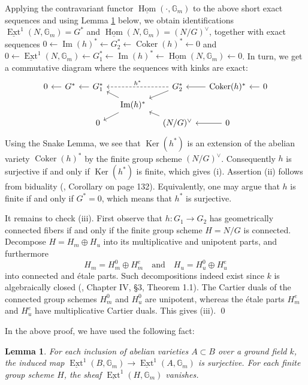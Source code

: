 \documentclass[oneside, 12pt]{amsart}
\newcommand\mylabel[1]{\label{#1}\marginpar{\vspace{-1ex}\medskip\medskip\footnotesize \tt #1}}
\renewcommand\mylabel[1]{\label{#1}}
\newtheorem{lemma}[theorem]{Lemma}
\theoremstyle{definition}
\theoremstyle{remark}
\newcommand{\GG}{\mathbb{G}}
\newcommand{\Cokernel}{\operatorname{Coker}}
\newcommand{\Image}{\operatorname{Im}}
\newcommand{\Kernel}{\operatorname{Ker}}
\newcommand{\quadand}{\quad\text{and}\quad}
\newcommand{\ra}{\rightarrow}
\newcommand{\uHom}{\underline{\operatorname{Hom}}}
\newcommand{\uExt}{\underline{\operatorname{Ext}}}
\begin{document}
Applying the contravariant functor $\uHom(\cdot,\GG_m)$ to the above short exact sequences and using Lemma \ref{sheaf ext} below, we obtain   identifications
$\uExt^1(N,\GG_m)=G^*$ and $\uHom(N,\GG_m)=(N/G)^\vee$, 
together with    exact sequences $0\leftarrow \Image(h)^*\leftarrow G_2^*\leftarrow \Cokernel(h)^*\leftarrow 0$ and 
$0\leftarrow \uExt^1(N,\GG_m)\leftarrow G_1^*\leftarrow \Image(h)^*\leftarrow\uHom(N,\GG_m)\leftarrow 0$.
In turn, we get a commutative  diagram  where the sequences with kinks are exact:
$$
\begin{tikzcd}[row sep=tiny, column sep=small ]
0	& G^*\ar[l]	& G_1^*\ar[l]		&		& G_2^*\ar[ld]\ar[ll,dashed,"h^*"']	& \Cokernel(h)^*\ar[l]	& 0\ar[l]\\
	&	&	& \Image(h)^*\ar[ld]\ar[lu]\\
	&	& 0	&		& (N/G)^\vee\ar[lu]	& 0\ar[l]
\end{tikzcd}
$$
Using the Snake Lemma, we see that $\Kernel(h^*)$ is an extension of the abelian variety $\Cokernel(h)^*$ by the finite group scheme
$(N/G)^\vee$. Consequently $h$ is surjective if and only if $\Kernel(h^*)$ is finite, which gives (i).
Assertion (ii) follows from biduality (\cite{Mumford 1970}, Corollary on page 132). Equivalently, one may argue that $h$ is finite if and only if $G^*=0$,
which means that $h^*$ is surjective.

It remains to check (iii). First observe that  $h:G_1\ra G_2$ has  geometrically connected fibers if and only if the finite group scheme $H=N/G$ is connected.
Decompose $H=H_m\oplus H_u$ into its multiplicative and unipotent   parts, and furthermore  
$$
H_m=H_m^0\oplus H_m^e\quadand H_u=H_u^0\oplus H_u^e
$$
into connected and \'etale parts. Such decompositions indeed exist  since $k$ is algebraically closed
(\cite{Demazure; Gabriel 1970}, Chapter IV, \S3, Theorem 1.1).
The Cartier duals of the connected group schemes  $H_m^0$ and $H_u^0$ are unipotent,
whereas the \'etale parts $H_m^e$ and $H_u^e$    have multiplicative Cartier duals. This gives (iii).
\qed

\medskip
In the above proof, we have used the following fact:

\begin{lemma}
\mylabel{sheaf ext}
For each inclusion of abelian varieties $A\subset B$ over a ground field $k$, the  induced  map $\uExt^1(B,\GG_m)\ra \uExt^1(A,\GG_m)$ is surjective.
For each finite group scheme $H$, the sheaf $\uExt^1(H,\GG_m)$   vanishes.
\end{lemma}
\end{document}
